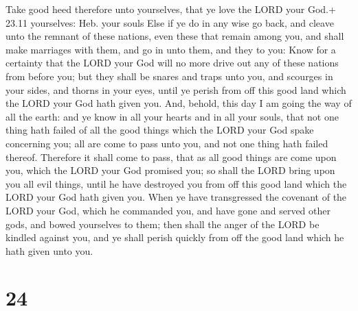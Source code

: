  Take good heed therefore unto yourselves, that ye love the
LORD your God.+ 23.11 yourselves: Heb. your souls  Else if
ye do in any wise go back, and cleave unto the remnant of these nations,
even these that remain among you, and shall make marriages with them,
and go in unto them, and they to you:  Know for a certainty
that the LORD your God will no more drive out any of these nations from
before you; but they shall be snares and traps unto you, and scourges in
your sides, and thorns in your eyes, until ye perish from off this good
land which the LORD your God hath given you.  And, behold,
this day I am going the way of all the earth: and ye know in all your
hearts and in all your souls, that not one thing hath failed of all the
good things which the LORD your God spake concerning you; all are come
to pass unto you, and not one thing hath failed thereof. 
Therefore it shall come to pass, that as all good things are come upon
you, which the LORD your God promised you; so shall the LORD bring upon
you all evil things, until he have destroyed you from off this good land
which the LORD your God hath given you.  When ye have
transgressed the covenant of the LORD your God, which he commanded you,
and have gone and served other gods, and bowed yourselves to them; then
shall the anger of the LORD be kindled against you, and ye shall perish
quickly from off the good land which he hath given unto you.

\hypertarget{section-23}{%
\section{24}\label{section-23}}

